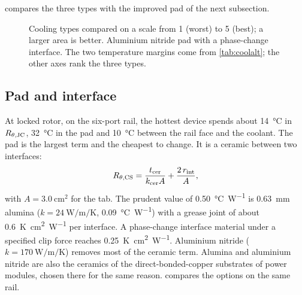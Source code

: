  compares the three types with the improved pad of
the next subsection.

\begin{figure}[H]
\centering

\caption{Cooling types compared on a scale from 1 (worst) to 5 (best); a
larger area is better. Aluminium nitride pad with a phase-change interface.
The two temperature margins come from \cref{tab:coolalt}; the other axes rank
the three types.}
\label{fig:radar-cooling}
\end{figure}

\subsection{Pad and interface}
\label{sec:coolalt}

At locked rotor, on the six-port rail, the hottest device spends about
\SI{14}{\celsius} in $R_{\theta,\mathrm{JC}}$, \SI{32}{\celsius} in the pad and
\SI{10}{\celsius} between the rail face and the coolant. The pad is the
largest term and the cheapest to change. It is a ceramic between two
interfaces:
%
\begin{equation}
  R_{\theta,\mathrm{CS}} = \frac{t_\mathrm{cer}}{k_\mathrm{cer} A} + \frac{2\,r_\mathrm{int}}{A},
\end{equation}
%
with $A = \SI{3.0}{\centi\metre\squared}$ for the tab. The prudent value of
\SI{0.50}{\celsius\per\watt} is \SI{0.63}{\milli\metre} alumina
($k = \SI{24}{\watt\per\metre\per\kelvin}$, \SI{0.09}{\celsius\per\watt})
with a grease joint of about \SI{0.6}{\kelvin\centi\metre\squared\per\watt}
per interface. A phase-change interface material under a specified clip
force reaches \SI{0.25}{\kelvin\centi\metre\squared\per\watt}. Aluminium
nitride ($k = \SI{170}{\watt\per\metre\per\kelvin}$) removes most of the
ceramic term. Alumina and aluminium nitride are also the ceramics of the
direct-bonded-copper substrates of power modules, chosen there for the same
reason.  compares the options on the same rail.

